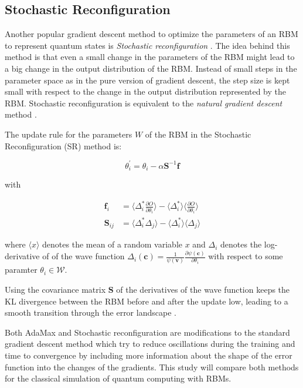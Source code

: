 \subsection{Stochastic Reconfiguration}
Another popular gradient descent method to optimize the parameters of an RBM to represent quantum states is 
\textit{Stochastic reconfiguration} \cite{}. The idea behind this method is that even a small change in the 
parameters of the RBM might lead to a big change in the output distribution of the RBM. Instead of small steps
 in the parameter space as in the pure version of gradient descent, the step size is kept small 
with respect to the change in the output distribution represented by the RBM. Stochastic reconfiguration is equivalent 
to the \textit{natural gradient descent} method \cite{}.

The update rule for the parameters $W$ of the RBM in the Stochastic Reconfiguration (SR) method is:

\begin{equation}
    \theta_i^{\prime} = \theta_i - \alpha \bm{S}^{-1} \bm{f}
\end{equation}

with

\begin{align}
    \bm{f}_i &= \langle \Delta_i^* \frac{\partial O}{\partial \theta_i} \rangle - \langle \Delta_i^* \rangle \langle \frac{\partial O}{\partial \theta_i} \rangle \\
    \bm{S}_{ij} &= \langle \Delta_i^* \Delta_j \rangle - \langle \Delta_i^* \rangle \langle \Delta_j \rangle
\end{align}

where $\langle x \rangle$ denotes the mean of a random variable $x$ and $\Delta_i$ denotes the log-derivative of 
of the wave function $\Delta_i(\bm{c}) = \frac{1}{\psi(\bm{v})}\frac{\partial \psi(\bm{c})}{\partial \theta_i}$ with 
respect to some paramter $\theta_i \in \mathcal{W}$.

Using the covariance matrix $\bm{S}$ of the derivatives of the wave function keeps the KL divergence between 
the RBM before and after the update low, leading to a smooth transition through the error landscape \cite{sorella1998green}.

Both AdaMax and Stochastic reconfiguration are modifications to the standard gradient descent method which 
try to reduce oscillations during the training and time to convergence by including more information about the 
shape of the error function into the changes of the gradients. This study will compare both methods for the classical simulation of quantum computing with RBMs.

